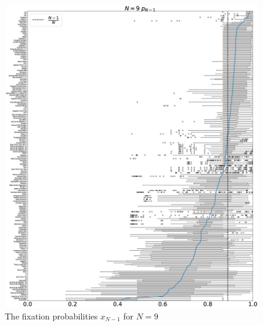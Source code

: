 \documentclass[10pt,letterpaper]{article}
\begin{document}
\begin{figure}[!hbtp]
    \centering
    \includegraphics[draft, width=\textwidth]{./Fig31.eps}
    \caption{The fixation probabilities \(x_{N-1}\) for \(N=9\)}
\end{figure}
\end{document}
